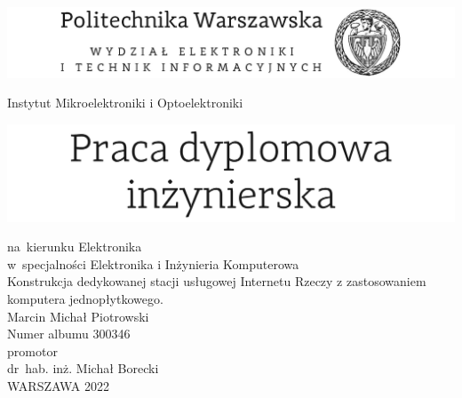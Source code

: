 \documentclass[12pt, twoside, openany]{mwrep}
\begin{document}
\begin{titlepage}
    \begin{center}
        {\sffamily
            \begin{center}
                \includegraphics[width=\textwidth]{titlepage/szablonEITI.png}\\   
            \end{center}
            \hfill \break
            \hfill \break
            Instytut Mikroelektroniki i Optoelektroniki\\
            \hfill \break
            \hfill \break
            \begin{center}
                \includegraphics[width=\textwidth]{titlepage/szablonINZ.png}\\
            \end{center}
            na~kierunku Elektronika\\
            w~specjalności Elektronika i Inżynieria Komputerowa\\
            \hfill \break
            \hfill \break
            \large
            Konstrukcja dedykowanej stacji usługowej Internetu Rzeczy z zastosowaniem komputera jednopłytkowego.\\
            \hfill \break
            \hfill \break
            \LARGE
            Marcin Michał Piotrowski\\
            \normalsize
            Numer albumu 300346\\
            \hfill \break
            \hfill \break
            promotor\\
            dr~hab. inż. Michał Borecki\\
            \vfill
            WARSZAWA 2022
        }
    \end{center}
    \newpage
    \thispagestyle{empty}
    \hfill
    
    \newpage

\end{titlepage}
\end{document}
